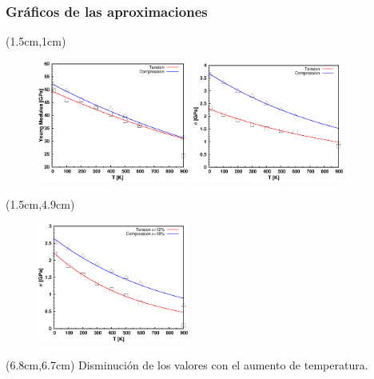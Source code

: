 \begin{frame}
 \frametitle{Gr\'aficos de las aproximaciones}
 \begin{textblock*}{10cm}(1.5cm,1cm)
 \begin{figure}[htp]
    \centering
    \includegraphics[width=5cm]{Presentacion_Mecom_2012/young_T_both.eps}
    \includegraphics[width=5cm]{Presentacion_Mecom_2012/peakstress_T_BOTH.eps}
  \end{figure} 
 \end{textblock*}
 \begin{textblock*}{5cm}(1.5cm,4.9cm)
   \begin{figure}[htp]
    \centering
    \includegraphics[width=5cm]{Presentacion_Mecom_2012/defstress_T_BOTH.eps}
  \end{figure} 
 \end{textblock*}
 \begin{textblock*}{5cm}(6.8cm,6.7cm)
  \centering
   Disminuci\'on de los valores con el aumento de temperatura.
  \end{textblock*}
\end{frame}
